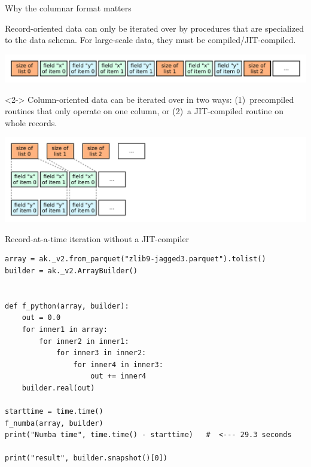 \documentclass[aspectratio=169]{beamer}
\begin{document}
\begin{frame}{Why the columnar format matters}
\vspace{0.35 cm}
\large

Record-oriented data can only be iterated over by procedures that are specialized to the data schema. For large-scale data, they must be compiled/JIT-compiled.

\includegraphics[width=\linewidth]{record-oriented.pdf}

\vspace{0.15 cm}
\begin{uncoverenv}<2->
Column-oriented data can be iterated over in two ways: (1)~precompiled routines that only operate on one column, or (2)~a JIT-compiled routine on whole records.

\includegraphics[width=\linewidth]{column-oriented.pdf}
\end{uncoverenv}

\vspace{-4 cm}
\hfill \begin{minipage}{0.48\linewidth}

\vspace{0.25 cm}
\end{minipage}
\vspace{4 cm}
\end{frame}

\begin{frame}[fragile]{Record-at-a-time iteration without a JIT-compiler}
\vspace{0.1 cm}
\small
\begin{verbatim}
array = ak._v2.from_parquet("zlib9-jagged3.parquet").tolist()
builder = ak._v2.ArrayBuilder()


def f_python(array, builder):
    out = 0.0
    for inner1 in array:
        for inner2 in inner1:
            for inner3 in inner2:
                for inner4 in inner3:
                    out += inner4
    builder.real(out)

starttime = time.time()
f_numba(array, builder)
print("Numba time", time.time() - starttime)   #  <--- 29.3 seconds

print("result", builder.snapshot()[0])
\end{verbatim}
\end{frame}
\end{document}

